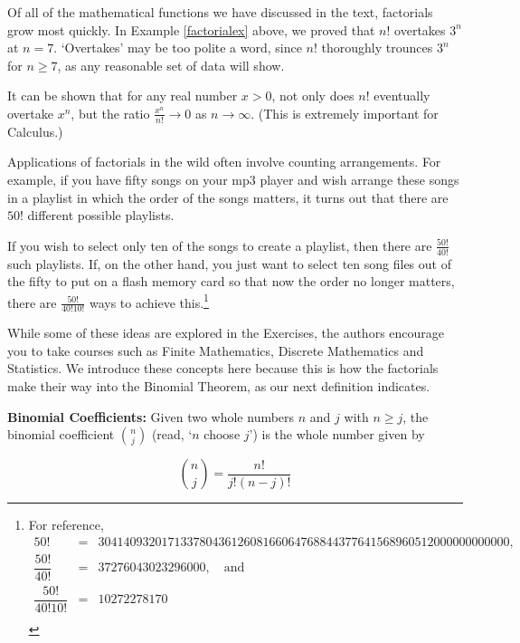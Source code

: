 Of all of the mathematical functions we have discussed in the text, factorials grow most quickly.  In  Example \ref{factorialex} above, we proved that $n!$ overtakes $3^{n}$ at $n=7$.  `Overtakes' may be too polite a word, since $n!$ thoroughly trounces $3^n$ for $n \geq 7$, as any reasonable set of data will show. 

\smallskip

It can be shown that for any real number $x > 0$, not only does $n!$ eventually overtake $x^n$, but the ratio $\frac{x^n}{n!} \rightarrow 0$ as $n \rightarrow \infty$. (This is extremely important for Calculus.)

\smallskip

Applications of factorials in the wild often involve counting arrangements. For example, if you have fifty songs on your mp3 player and wish arrange these songs in a playlist in which the order of the songs matters, it turns out that there are $50!$ different possible playlists. 

\smallskip

If you wish to select only ten of the songs to create a playlist, then there are $\frac{50!}{40!}$ such playlists.  If, on the other hand, you just want to select ten song files out of the fifty to put on a flash memory card so that now the order no longer matters, there are $\frac{50!}{40! 10!}$ ways to achieve this.\footnote{For reference, \[\begin{array}{ccl} 50! & = &  30414093201713378043612608166064768844377641568960512000000000000, \\  \dfrac{50!}{40!} & = & 37276043023296000, \quad \text{and} \\ [5pt] \dfrac{50!}{40!  10!} & = & 10272278170 \\ \end{array}\]} 

\smallskip

 While some of these ideas are explored in the Exercises, the authors encourage you to take courses such as Finite Mathematics, Discrete Mathematics and Statistics. We introduce these concepts here because this is how the factorials make their way into the Binomial Theorem, as our next definition indicates.

\smallskip

\colorbox{ResultColor}{\bbm

\begin{defn} \label{binomialcoeff}  \textbf{Binomial Coefficients:}  Given two whole numbers $n$ and $j$ with $n \geq j$, the  binomial coefficient  {\boldmath $\displaystyle \binom{n}{j}$} (read, `$n$ choose $j$') is the whole number given by

\[ \binom{n}{j} = \dfrac{n!}{j! (n-j)!} \]

\end{defn}
\ebm}

